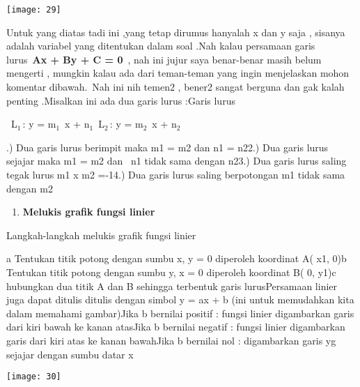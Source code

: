 \documentclass[11pt,fleqn]{book} %
\begin{document}
\noindent 

\begin{center}
\noindent \texttt{[image: 29]}
\end{center}

\noindent Untuk yang diatas tadi ini ,yang tetap dirumus hanyalah x dan y saja , sisanya adalah variabel yang ditentukan dalam soal .Nah kalau persamaan garis lurus~\textbf{Ax + By + C = 0}~, nah ini jujur saya benar-benar masih belum mengerti , mungkin kalau ada dari teman-teman yang ingin menjelaskan mohon komentar dibawah.~Nah ini nih temen2 , bener2 sangat berguna dan gak kalah penting .Misalkan ini ada dua garis lurus :Garis lurus~

\noindent ~L${}_{1~}$: y = m${}_{1}$~x + n${}_{1}$~L${}_{2~}$: y = m${}_{2}$~x + n${}_{2~~}$

.) Dua garis lurus berimpit maka m1 = m2 dan n1 = n22.) Dua garis lurus sejajar maka m1 = m2 dan ~n1 tidak sama dengan n23.) Dua garis lurus saling tegak lurus m1 x m2 =-14.) Dua garis lurus saling berpotongan m1 tidak sama dengan m2

\noindent 

\begin{enumerate}
\item  \textbf{Melukis grafik fungsi linier}
\end{enumerate}

\noindent Langkah-langkah melukis grafik fungsi linier

\noindent a Tentukan titik potong dengan sumbu x, y = 0 diperoleh koordinat A( x1, 0)b Tentukan titik potong dengan sumbu y, x = 0 diperoleh koordinat B( 0, y1)c hubungkan dua titik A dan B sehingga terbentuk garis lurusPersamaan linier juga dapat ditulis ditulis dengan simbol y = ax + b (ini untuk memudahkan kita dalam memahami gambar)Jika b bernilai positif : fungsi linier digambarkan garis dari kiri bawah ke kanan atasJika b bernilai negatif : fungsi linier digambarkan garis dari kiri atas ke kanan bawahJika b bernilai nol : digambarkan garis yg sejajar dengan sumbu datar x

\begin{center}
\noindent \texttt{[image: 30]}
\end{center}

\noindent ~

\noindent 

\noindent 

\noindent 
\end{document}
